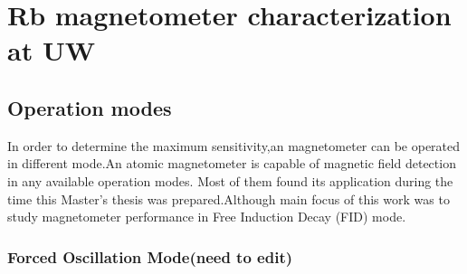 \chapter{Rb magnetometer characterization at UW\label{ch:characterization}}

\section{Operation modes}

 In order to determine the maximum sensitivity,an magnetometer can be operated in different mode.An atomic
magnetometer is capable of magnetic field detection in any available operation modes. Most of them found its application during the time this Master's thesis was prepared.Although main focus of this work was to study magnetometer performance in Free Induction Decay (FID) mode.
 \subsection{Forced Oscillation Mode(need to edit)}

